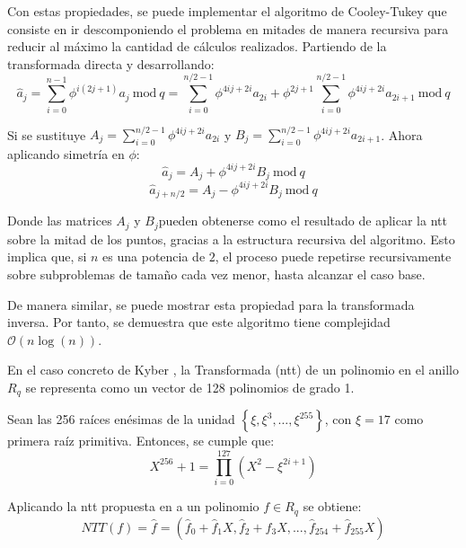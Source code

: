 Con estas propiedades, se puede implementar el algoritmo de Cooley-Tukey \cite{CooleyALG} que consiste en ir descomponiendo el problema en mitades de manera recursiva para reducir al máximo la cantidad de cálculos realizados. Partiendo de la transformada directa y desarrollando:
\begin{equation}
	\hat{a}_j=\sum_{i=0}^{n-1} \phi^{i\left(2j+1\right)} a_j \ \text{mod} \ q = \sum_{i=0}^{n/2-1} \phi^{4ij+2i} a_{2i} + \phi^{2j+1} \sum_{i=0}^{n/2-1} \phi^{4ij+2i} a_{2i+1} \ \text{mod} \ q
\end{equation}

Si se sustituye \(A_j=\sum_{i=0}^{n/2-1} \phi^{4ij+2i} a_{2i}\) y \(B_j=\sum_{i=0}^{n/2-1} \phi^{4ij+2i} a_{2i+1}\). Ahora aplicando simetría en \(\phi\):
\begin{equation}
	\hat{a}_j=A_j+\phi^{4ij+2i}B_j  \ \text{mod} \ q
\end{equation}
\begin{equation}
	\hat{a}_{j+n/2}=A_j-\phi^{4ij+2i}B_j  \ \text{mod} \ q
\end{equation}

Donde las matrices \(A_j\) y \(B_j\)pueden obtenerse como el resultado de aplicar la \acrshort{ntt} sobre la mitad de los puntos, gracias a la estructura recursiva del algoritmo. Esto implica que, si \(n\) es una potencia de \(2\), el proceso puede repetirse recursivamente sobre subproblemas de tamaño cada vez menor, hasta alcanzar el caso base. 
\newline

De manera similar, se puede mostrar esta propiedad para la transformada inversa. Por tanto, se demuestra que este algoritmo tiene complejidad \(\mathcal{O}(n \log(n))\).
\newline

En el caso concreto de Kyber \cite{kyber-spec-2021}, la Transformada (\acrshort{ntt}) de un polinomio en el anillo \(R_q\) se representa como un vector de 128 polinomios de grado 1.
\newline

Sean las 256 raíces enésimas de la unidad \(\left\{\xi, \xi^3, \dots, \xi^{255}\right\}\), con \(\xi = 17\) como primera raíz primitiva. Entonces, se cumple que:
\begin{equation}
	X^{256}+1=\prod_{i=0}^{127}\left(X^2- \xi^{2i+1}\right)
\end{equation}

Aplicando la \acrshort{ntt} propuesta en \cite{kyber-spec-2021} a un polinomio \(f\in R_q\) se obtiene:
\begin{equation}
	NTT(f)=\hat{f}=\left(\hat{f}_0+\hat{f}_1X,\hat{f}_2+\hat{f}_3X,...,\hat{f}_{254}+\hat{f}_{255}X\right)
\end{equation}

